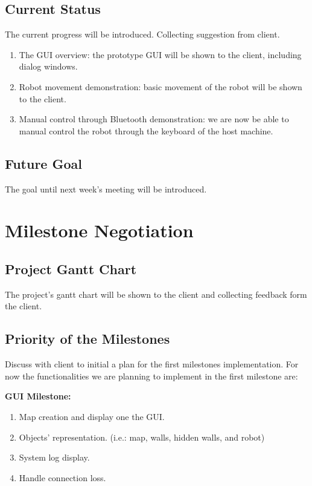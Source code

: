 \documentclass[11pt, a4paper]{article}
\begin{document}
\subsection{Current Status}
The current progress will be introduced. Collecting suggestion from client.
\begin{enumerate}
\item The GUI overview: the prototype GUI will be shown to the client, including dialog windows.
\item Robot movement demonstration: basic movement of the robot will be shown to the client.
\item Manual control through Bluetooth demonstration: we are now be able to manual control the robot through the keyboard of the host machine. 
\end{enumerate}
\subsection{Future Goal}
The goal until next week's meeting will be introduced. 



\section{Milestone Negotiation}
\subsection{Project Gantt Chart}
The project's gantt chart will be shown to the client and collecting feedback form the client. 
\subsection{Priority of the Milestones}
Discuss with client to initial a plan for the first milestones implementation. For now the functionalities we are planning to implement in the first milestone are:

\textbf{GUI Milestone: }
\begin{enumerate}
\item Map creation and display one the GUI.
\item Objects' representation. (i.e.: map, walls, hidden walls, and robot)
\item System log display.
\item Handle connection loss.
\end{enumerate}
\end{document}
